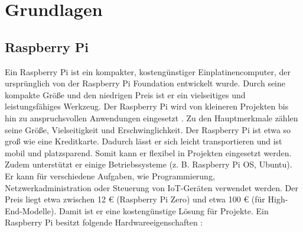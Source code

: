 \clearpage
\section{Grundlagen}


\subsection{Raspberry Pi}
Ein Raspberry Pi ist ein kompakter, kostengünstiger Einplatinencomputer, der ursprünglich von der Raspberry Pi Foundation entwickelt wurde. Durch seine kompakte Größe und den niedrigen Preis ist er ein vielseitiges und leistungsfähiges Werkzeug. Der Raspberry Pi wird von kleineren Projekten bis hin zu anspruchsvollen Anwendungen eingesetzt \cite{raspberrypi_official_doc}.
\newline 
\newline 
Zu den Hauptmerkmale zählen seine Größe, Vielseitigkeit und Erschwinglichkeit. 
\newline
Der Raspberry Pi ist etwa so groß wie eine Kreditkarte. Dadurch lässt er sich leicht transportieren und ist mobil und platzsparend. Somit kann er flexibel in Projekten eingesetzt werden.
Zudem unterstützt er einige Betriebssysteme (z. B. Raspberry Pi OS, Ubuntu). Er kann für verschiedene Aufgaben, wie Programmierung, Netzwerkadministration oder Steuerung von IoT-Geräten verwendet werden.
Der Preis liegt etwa zwischen 12 € (Raspberry Pi Zero) und etwa 100 € (für High-End-Modelle). Damit ist er eine kostengünstige Lösung für Projekte.
\newline 
\newline 
Ein Raspberry Pi besitzt folgende Hardwareeigenschaften \cite{raspberrypi4_datasheet}:
